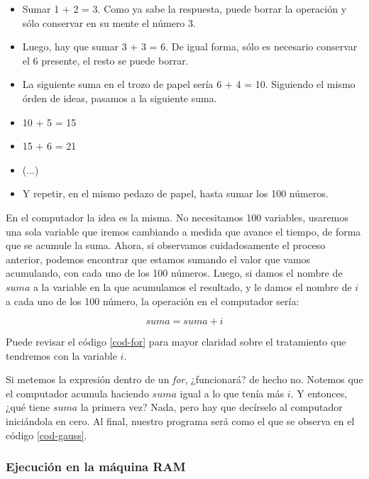 \begin{itemize}
\item Sumar 1 + 2 = 3. Como ya sabe la respuesta, puede borrar la operación y sólo conservar en su mente el número 3.
\item Luego, hay que sumar 3 + 3 = 6. De igual forma, sólo es necesario conservar el 6 presente, el resto se puede borrar.
\item La siguiente suma en el trozo de papel sería 6 + 4 = 10. Siguiendo el mismo órden de ideas, pasamos a la siguiente suma.
\item 10 + 5 = 15
\item 15 + 6 = 21
\item (...)
\item Y repetir, en el mismo pedazo de papel, hasta sumar los 100 números. 
\end{itemize}

En el computador la idea es la misma. No necesitamos 100 variables, usaremos una sola variable que iremos cambiando a medida que avance el tiempo, de forma que se acumule la suma. Ahora, si observamos cuidadosamente el proceso anterior, podemos encontrar que estamos sumando el valor que vamos acumulando, con cada uno de los 100 números. Luego, si damos el nombre de $suma$ a la variable en la que acumulamos el resultado, y le damos el nombre de $i$ a cada uno de los 100 número, la operación en el computador sería: 

\begin{equation}
suma = suma + i
\end{equation}

Puede revisar el código \ref{cod-for} para mayor claridad sobre el tratamiento que tendremos con la variable $i$.

Si metemos la expresión dentro de un \emph{for}, ¿funcionará? de hecho no. Notemos que el computador acumula haciendo $suma$ igual a lo que tenía más $i$. Y entonces, ¿qué tiene $suma$ la primera vez? Nada, pero hay que decírselo al computador iniciándola en cero. Al final, nuestro programa será como el que se observa en el código \ref{cod-gauss}. \\



\subsubsection{Ejecución en la máquina RAM}

